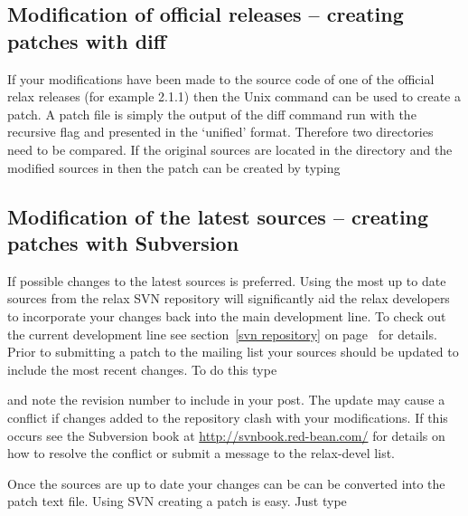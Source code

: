 \subsection{Modification of official releases -- creating patches with diff}

If your modifications have been made to the source code of one of the official relax releases (for example 2.1.1) then the Unix command  can be used to create a patch.  A patch file is simply the output of the diff command run with the recursive flag and presented in the `unified' format.  Therefore two directories need to be compared.  If the original sources are located in the directory  and the modified sources in  then the patch can be created by typing




\subsection{Modification of the latest sources -- creating patches with Subversion}

If possible changes to the latest sources is preferred.  Using the most up to date sources from the relax SVN repository will significantly aid the relax developers to incorporate your changes back into the main development line.  To check out the current development line see section~\ref{svn repository} on page~\pageref{svn repository} for details.  Prior to submitting a patch to the mailing list your sources should be updated to include the most recent changes.  To do this type


and note the revision number to include in your post.  The update may cause a conflict if changes added to the repository clash with your modifications.  If this occurs see the Subversion book at \href{http://svnbook.red-bean.com/}{http://svnbook.red-bean.com/} for details on how to resolve the conflict or submit a message to the rela\mbox{x-d}evel list.

Once the sources are up to date your changes can be can be converted into the patch text file.  Using SVN creating a patch is easy.  Just type

